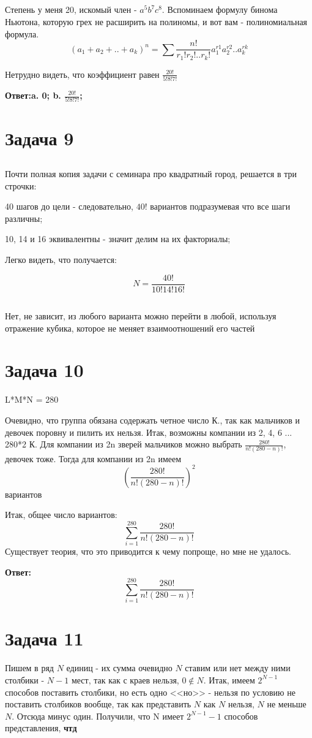 \documentclass[11pt]{article}
\begin{document}
\subsection{}
Степень у меня 20, искомый член - $a^5b^7c^8$. Вспоминаем формулу бинома Ньютона, которую грех не расширить на полиномы, и вот вам - полиномиальная формула.
$$(a_1+a_2+..+a_k)^n = \sum \frac{n!}{r_1!r_2!..r_k!}a_1^{r1}a_2^{r2}..a_k^{rk}$$

Нетрудно видеть, что коэффициент равен $\frac{20!}{5!8!7!}$

\textbf{Ответ:a. 0; b. $\frac{20!}{5!8!7!}$;}

\section{Задача 9}
\subsection{}
Почти полная копия задачи с семинара про квадратный город, решается в три строчки:

40 шагов до цели - следовательно, $40!$ вариантов подразумевая что все шаги различны;

10, 14 и 16 эквивалентны - значит делим на их факториалы;

Легко видеть, что получается:

$$N=\frac{40!}{10!14!16!}$$ 

\subsection{}

Нет, не зависит, из любого варианта можно перейти в любой, используя отражение кубика, которое не меняет взаимоотношений его частей

\section{Задача 10}
L*M*N = 280

Очевидно, что группа обязана содержать четное число К., так как мальчиков и девочек поровну и пилить их нельзя. Итак, возможны компании из 2, 4, 6 ... 280*2 К. Для компании из 2n зверей мальчиков можно выбрать $\frac{280!}{n!(280-n)!}$, девочек тоже. Тогда для компании из 2n имеем $$(\frac{280!}{n!(280-n)!})^2$$ вариантов

Итак, общее число вариантов: 
$$\sum_{i=1}^{280}\frac{280!}{n!(280-n)!}$$
Существует теория, что это приводится к чему попроще, но мне не удалось.

\textbf{Ответ:$$\sum_{i=1}^{280}\frac{280!}{n!(280-n)!}$$}

\section{Задача 11}

Пишем в ряд $N$ единиц - их сумма очевидно $N$
ставим или нет между ними столбики - $N-1$ мест, так как с краев нельзя, $0 \notin N$. Итак, имеем $2^{N-1}$ способов поставить столбики, но есть одно <<но>> - нельзя по условию не поставить столбиков вообще, так как представить $N$ как $N$ нельзя, $N$ не меньше $N$. Отсюда минус один. Получили, что N имеет $2^{N-1}-1$ способов представления, \textbf{чтд}
\end{document}
